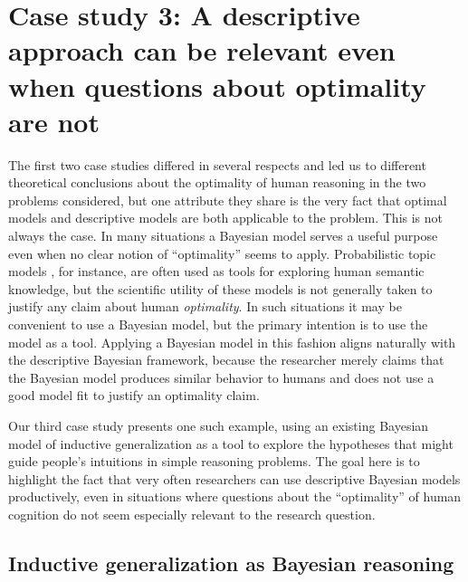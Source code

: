 
\section*{Case study 3: A descriptive approach can be relevant even when questions about optimality are not} 

The first two case studies differed in several respects and led us to different theoretical conclusions about the optimality of human reasoning in the two problems considered, but one attribute they share is the very fact that optimal models and descriptive models are both applicable to the problem. This is not always the case. In many situations a Bayesian model serves a useful purpose even when no clear notion of ``optimality'' seems to apply. Probabilistic topic models \cite{steyvers_probabilistic_2007}, for instance, are often used as tools for exploring human semantic knowledge, but the scientific utility of these models is not generally taken to justify any claim about human {\it optimality}. In such situations it may be convenient to use a Bayesian model, but the primary intention is to use the model as a tool. Applying a Bayesian model in this fashion aligns naturally with the descriptive Bayesian framework, because the researcher merely claims that the Bayesian model produces similar behavior to humans and does not use a good model fit to justify an optimality claim. 

Our third case study presents one such example, using an existing Bayesian model of inductive generalization as a tool to explore the hypotheses that might guide people's intuitions in simple reasoning problems. The goal here is to highlight the fact that very often researchers can use descriptive Bayesian models productively, even in situations where questions about the ``optimality'' of human cognition do not seem especially relevant to the research question. 






\subsection{Inductive generalization as Bayesian reasoning}

